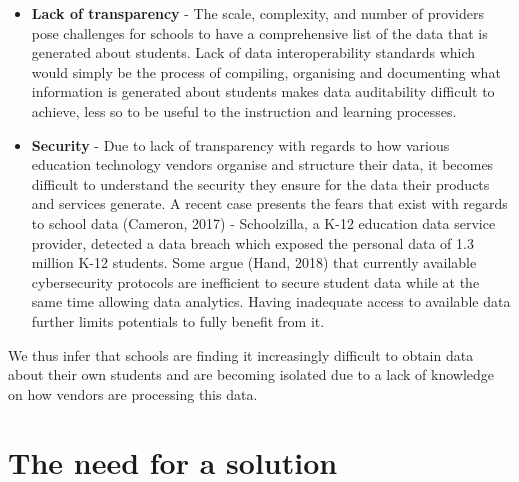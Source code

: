 \documentclass{article}
\begin{document}
\begin{itemize}
  \item \textbf{Lack of transparency} - The scale, complexity, and number of providers pose challenges for schools to have a comprehensive list of the data that is generated about students. Lack of data interoperability standards which would simply be the process of compiling, organising and documenting what information is generated about students makes data auditability difficult to achieve, less so to be useful to the instruction and learning processes. 
  
  \item \textbf{Security} - Due to lack of transparency with regards to how various education technology vendors organise and structure their data, it becomes difficult to understand the security they ensure for the data their products and services generate. A recent case  presents the fears that exist with regards to school data (Cameron, 2017) - Schoolzilla, a K-12 education data service provider, detected a data breach which exposed the personal data of 1.3 million K-12 students. Some argue (Hand, 2018) that currently available cybersecurity protocols are inefficient to secure student data while at the same time allowing data analytics. Having inadequate access to available data further limits potentials to fully benefit from it.
  
\end{itemize}

We thus infer that schools are finding it increasingly difficult to obtain data about their own students and are becoming isolated due to a lack of knowledge on how vendors are processing this data.

\section{The need for a solution}
\end{document}
